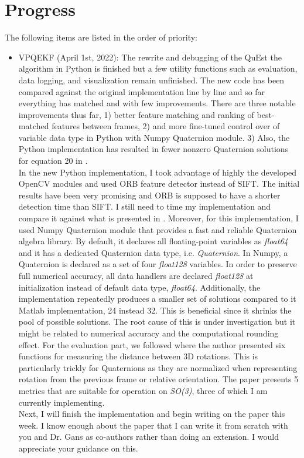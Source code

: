 \documentclass[11pt]{article}
\begin{document}
\section{Progress}
The following items are listed in the order of priority:
\begin{itemize}
    \item VPQEKF (April 1st, 2022): The rewrite and debugging of the QuEst
    the algorithm in Python is finished but a few utility functions such as
    evaluation, data logging, and visualization remain unfinished. The new
    code has been compared against the original implementation line by line
    and so far everything has matched and with few improvements. There are
    three notable improvements thus far, 1) better feature matching and ranking
    of best-matched features between frames, 2) and more fine-tuned control
    over of variable data type in Python with Numpy Quaternion module. 3) Also,
    the Python implementation has resulted in fewer nonzero Quaternion solutions
    for equation 20 in \cite{quest}.\\
    In the new Python implementation, I took advantage of highly the developed
    OpenCV modules and used ORB feature detector instead of SIFT. The initial
    results have been very promising and ORB is supposed to have a shorter
    detection time than SIFT. I still need to time my implementation and
    compare it against what is presented in \cite{quest}. Moreover, for this
    implementation, I used Numpy Quaternion module that provides a fast and
    reliable Quaternion algebra library. By default, it declares all
    floating-point variables as \emph{float64} and it has a dedicated Quaternion data
    type, i.e. \emph{Quaternion}. In Numpy, a Quaternion is declared as a set
    of four \emph{float128} variables. In order to preserve full numerical
    accuracy, all data handlers are declared \emph{float128} at initialization
    instead of default data type, \emph{float64}. Additionally, the
    implementation repeatedly produces a smaller set of solutions compared to
    it Matlab implementation, 24 instead 32. This is beneficial since it shrinks
    the pool of possible solutions. The root cause of this is under
    investigation but it might be related to numerical accuracy and the
    computational rounding effect.
    For the evaluation part, we followed \cite{huynh2009metrics}
    where the author presented six functions for measuring the distance between 3D
    rotations. This is particularly trickly for Quaternions as they are
    normalized when representing rotation from the previous frame or relative
    orientation. The paper presents 5 metrics that are suitable for operation
    on \emph{SO(3)}, three of which I am currently implementing.\\
    Next, I will finish the implementation and begin writing on the paper this
    week. I know enough about the paper that I can write it from scratch with
    you and Dr. Gans as co-authors rather than doing an extension. I would
    appreciate your guidance on this.


\end{itemize}
\end{document}
